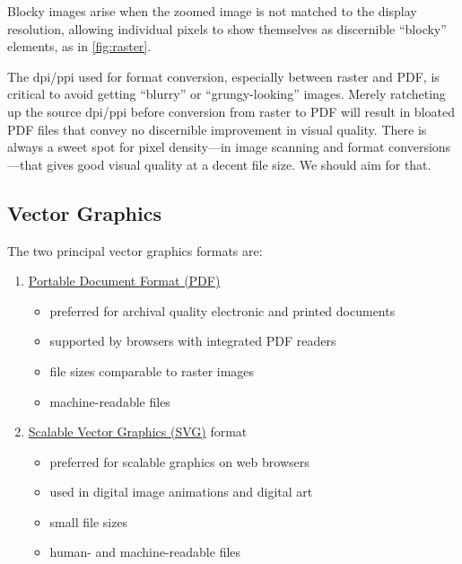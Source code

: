 \documentclass[
  a4paper,
]{article}
\providecommand{\tightlist}{%
  \setlength{\itemsep}{0pt}\setlength{\parskip}{0pt}}
\begin{document}
Blocky images arise when the zoomed image is not matched to the display
resolution, allowing individual pixels to show themselves as discernible
``blocky'' elements, as in \cref{fig:raster}.

The dpi/ppi used for format conversion, especially between raster and
PDF, is critical to avoid getting ``blurry'' or ``grungy-looking''
images. Merely ratcheting up the source dpi/ppi before conversion from
raster to PDF will result in bloated PDF files that convey no
discernible improvement in visual quality. There is always a sweet spot
for pixel density---in image scanning and format conversions---that
gives good visual quality at a decent file size. We should aim for that.

\hypertarget{vector-graphics}{%
\subsection{Vector Graphics}\label{vector-graphics}}

The two principal vector graphics formats are:

\begin{enumerate}
\tightlist
\item
  \href{https://en.wikipedia.org/wiki/PDF}{Portable Document Format
  (PDF)}

  \begin{itemize}
  \tightlist
  \item
    preferred for archival quality electronic and printed documents
  \item
    supported by browsers with integrated PDF readers
  \item
    file sizes comparable to raster images
  \item
    machine-readable files
  \end{itemize}
\item
  \href{https://en.wikipedia.org/wiki/Scalable_Vector_Graphics}{Scalable
  Vector Graphics (SVG)} format

  \begin{itemize}
  \tightlist
  \item
    preferred for scalable graphics on web browsers
  \item
    used in digital image animations and digital art
  \item
    small file sizes
  \item
    human- and machine-readable files
  \end{itemize}
\end{enumerate}
\end{document}
